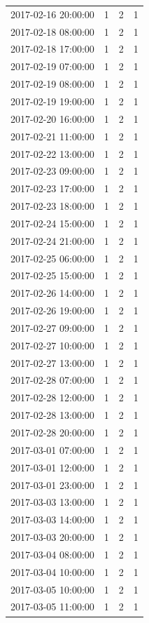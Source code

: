\begin{tabular}{lrrr}
2017-02-16 20:00:00 & 1 & 2 & 1 \\
2017-02-18 08:00:00 & 1 & 2 & 1 \\
2017-02-18 17:00:00 & 1 & 2 & 1 \\
2017-02-19 07:00:00 & 1 & 2 & 1 \\
2017-02-19 08:00:00 & 1 & 2 & 1 \\
2017-02-19 19:00:00 & 1 & 2 & 1 \\
2017-02-20 16:00:00 & 1 & 2 & 1 \\
2017-02-21 11:00:00 & 1 & 2 & 1 \\
2017-02-22 13:00:00 & 1 & 2 & 1 \\
2017-02-23 09:00:00 & 1 & 2 & 1 \\
2017-02-23 17:00:00 & 1 & 2 & 1 \\
2017-02-23 18:00:00 & 1 & 2 & 1 \\
2017-02-24 15:00:00 & 1 & 2 & 1 \\
2017-02-24 21:00:00 & 1 & 2 & 1 \\
2017-02-25 06:00:00 & 1 & 2 & 1 \\
2017-02-25 15:00:00 & 1 & 2 & 1 \\
2017-02-26 14:00:00 & 1 & 2 & 1 \\
2017-02-26 19:00:00 & 1 & 2 & 1 \\
2017-02-27 09:00:00 & 1 & 2 & 1 \\
2017-02-27 10:00:00 & 1 & 2 & 1 \\
2017-02-27 13:00:00 & 1 & 2 & 1 \\
2017-02-28 07:00:00 & 1 & 2 & 1 \\
2017-02-28 12:00:00 & 1 & 2 & 1 \\
2017-02-28 13:00:00 & 1 & 2 & 1 \\
2017-02-28 20:00:00 & 1 & 2 & 1 \\
2017-03-01 07:00:00 & 1 & 2 & 1 \\
2017-03-01 12:00:00 & 1 & 2 & 1 \\
2017-03-01 23:00:00 & 1 & 2 & 1 \\
2017-03-03 13:00:00 & 1 & 2 & 1 \\
2017-03-03 14:00:00 & 1 & 2 & 1 \\
2017-03-03 20:00:00 & 1 & 2 & 1 \\
2017-03-04 08:00:00 & 1 & 2 & 1 \\
2017-03-04 10:00:00 & 1 & 2 & 1 \\
2017-03-05 10:00:00 & 1 & 2 & 1 \\
2017-03-05 11:00:00 & 1 & 2 & 1 \\

\end{tabular}
